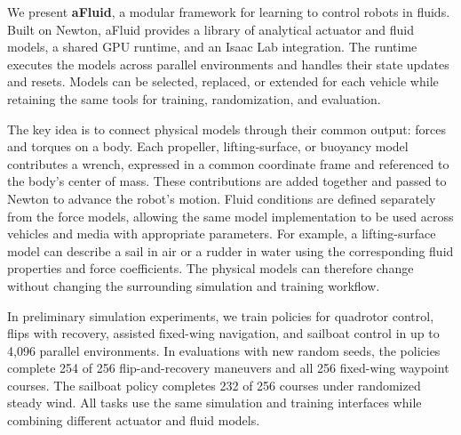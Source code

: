 We present \textbf{aFluid}, a modular framework for learning to control robots in fluids.
%
Built on Newton, aFluid provides a library of analytical actuator and fluid models, a shared GPU runtime, and an Isaac Lab integration.
%
The runtime executes the models across parallel environments and handles their state updates and resets.
%
Models can be selected, replaced, or extended for each vehicle while retaining the same tools for training, randomization, and evaluation.

The key idea is to connect physical models through their common output: forces and torques on a body.
%
Each propeller, lifting-surface, or buoyancy model contributes a wrench, expressed in a common coordinate frame and referenced to the body's center of mass.
%
These contributions are added together and passed to Newton to advance the robot's motion.
%
Fluid conditions are defined separately from the force models, allowing the same model implementation to be used across vehicles and media with appropriate parameters.
%
For example, a lifting-surface model can describe a sail in air or a rudder in water using the corresponding fluid properties and force coefficients.
%
The physical models can therefore change without changing the surrounding simulation and training workflow.

In preliminary simulation experiments, we train policies for quadrotor control, flips with recovery, assisted fixed-wing navigation, and sailboat control in up to 4,096 parallel environments.
%
In evaluations with new random seeds, the policies complete 254 of 256 flip-and-recovery maneuvers and all 256 fixed-wing waypoint courses.
%
The sailboat policy completes 232 of 256 courses under randomized steady wind.
%
All tasks use the same simulation and training interfaces while combining different actuator and fluid models.